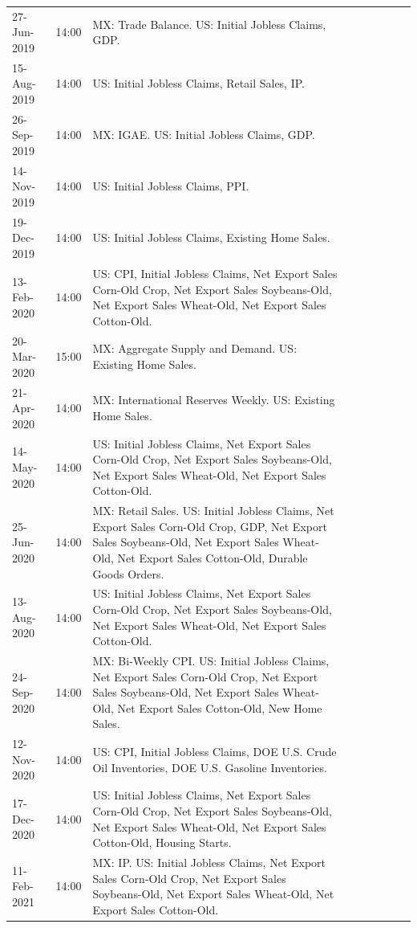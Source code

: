 \documentclass[a4paper,12pt]{article} 		%
\begin{document}
\begin{tiny}
\begin{center}
\begin{longtable}{p{1.8cm}p{1cm}p{11.7cm}p{1.8cm}p{1cm}p{11.7cm}p{1.8cm}p{1cm}p{11.7cm}}
			27-Jun-2019 & 14:00 & MX: Trade Balance. US: Initial Jobless Claims, GDP. \\
			15-Aug-2019 & 14:00 & US: Initial Jobless Claims, Retail Sales, IP. \\
			26-Sep-2019 & 14:00 & MX: IGAE. US: Initial Jobless Claims, GDP. \\
			14-Nov-2019 & 14:00 & US: Initial Jobless Claims, PPI. \\
			19-Dec-2019 & 14:00 & US: Initial Jobless Claims, Existing Home Sales. \\
			13-Feb-2020 & 14:00 & US: CPI, Initial Jobless Claims, Net Export Sales Corn-Old Crop, Net Export Sales Soybeans-Old, Net Export Sales Wheat-Old, Net Export Sales Cotton-Old. \\
			20-Mar-2020 & 15:00 & MX: Aggregate Supply and Demand. US: Existing Home Sales. \\
			21-Apr-2020 & 14:00 & MX: International Reserves Weekly. US: Existing Home Sales. \\
			14-May-2020 & 14:00 & US: Initial Jobless Claims, Net Export Sales Corn-Old Crop, Net Export Sales Soybeans-Old, Net Export Sales Wheat-Old, Net Export Sales Cotton-Old. \\
			25-Jun-2020 & 14:00 & MX: Retail Sales. US: Initial Jobless Claims, Net Export Sales Corn-Old Crop, GDP, Net Export Sales Soybeans-Old, Net Export Sales Wheat-Old, Net Export Sales Cotton-Old, Durable Goods Orders. \\
			13-Aug-2020 & 14:00 & US: Initial Jobless Claims, Net Export Sales Corn-Old Crop, Net Export Sales Soybeans-Old, Net Export Sales Wheat-Old, Net Export Sales Cotton-Old. \\
			24-Sep-2020 & 14:00 & MX: Bi-Weekly CPI. US: Initial Jobless Claims, Net Export Sales Corn-Old Crop, Net Export Sales Soybeans-Old, Net Export Sales Wheat-Old, Net Export Sales Cotton-Old, New Home Sales. \\
			12-Nov-2020 & 14:00 & US: CPI, Initial Jobless Claims, DOE U.S. Crude Oil Inventories, DOE U.S. Gasoline Inventories. \\
			17-Dec-2020 & 14:00 & US: Initial Jobless Claims, Net Export Sales Corn-Old Crop, Net Export Sales Soybeans-Old, Net Export Sales Wheat-Old, Net Export Sales Cotton-Old, Housing Starts. \\
			11-Feb-2021 & 14:00 & MX: IP. US: Initial Jobless Claims, Net Export Sales Corn-Old Crop, Net Export Sales Soybeans-Old, Net Export Sales Wheat-Old, Net Export Sales Cotton-Old. \\

\end{longtable}
\end{center}
\end{tiny}
\end{document}
